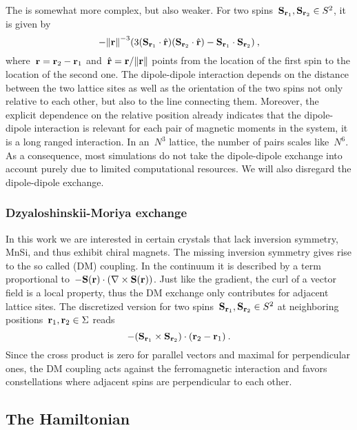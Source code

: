 The  is somewhat more complex, but also
weaker.  For two spins~$\mathbf{S}_{\mathbf{r}_1}, \mathbf{S}_{\mathbf{r}_2} \in S^2$, it is given by
%
\begin{equation}
  - {\norm{\r}^{-3}} (3 (\S_{\r_1} \cdot \hat{\r})
  (\S_{\r_2} \cdot \hat{\r}) - \S_{\r_1} \cdot \S_{\r_2})\:,
\end{equation}
%
where~$\mathbf{r} = \mathbf{r}_2 - \mathbf{r}_1$ and~$\hat{\r} = \r / \norm{\r}$ points from the
location of the first spin to the location of the second one. The dipole-dipole
interaction depends on the distance between the two lattice sites as well as the
orientation of the two spins not only relative to each other, but also to the
line connecting them. Moreover, the explicit dependence on the relative position
already indicates that the dipole-dipole interaction is relevant for each pair
of magnetic moments in the system, it is a long ranged interaction. In an~$N^3$
lattice, the number of pairs scales like~$N^6$. As a consequence, most
simulations do not take the dipole-dipole exchange into account purely due to
limited computational resources. We will also disregard the dipole-dipole
exchange.

\subsubsection{Dzyaloshinskii-Moriya exchange}

In this work we are interested in certain crystals that lack inversion symmetry,
\eg{} MnSi, and thus exhibit chiral magnets. The missing inversion symmetry
gives rise to the so called  (DM) coupling.
In the continuum it is described by a term proportional to~$-\mathbf{S}(\mathbf{r}) \cdot
(\nabla \times \mathbf{S}(\mathbf{r}))$. Just like the gradient, the curl of a vector field is a
local property, thus the DM exchange only contributes for adjacent lattice
sites. The discretized version for two spins~$\mathbf{S}_{\mathbf{r}_1}, \mathbf{S}_{\mathbf{r}_2} \in S^2$ at
neighboring positions~$\mathbf{r}_1, \mathbf{r}_2 \in \Sigma$ reads
\begin{equation}
  - (\mathbf{S}_{\mathbf{r}_1} \times \mathbf{S}_{\mathbf{r}_2}) \cdot (\mathbf{r}_2 - \mathbf{r}_1)\:.
\end{equation}
%
Since the cross product is zero for parallel vectors and maximal for
perpendicular ones, the DM coupling acts against the ferromagnetic interaction
and favors constellations where adjacent spins are perpendicular to each other.

\subsection{The Hamiltonian}

